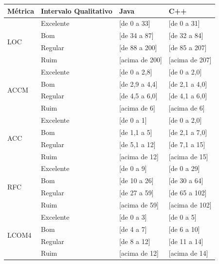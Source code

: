 \begin{table}[!ht]
	\begin{center}
	\begin{tabular}{ |l|l|l|l| }
		\hline
		Métrica & Intervalo Qualitativo & Java & C++ \\ \hline
		\multirow{4}{*}{LOC} 
		 & Excelente & [de 0 a 33] & [de 0 a 31] \\
		 & Bom & [de 34 a 87] & [de 32 a 84] \\
		 & Regular & [de 88 a 200] & [de 85 a 207] \\
		 & Ruim & [acima de 200] & [acima de 207] \\ \hline

		\multirow{4}{*}{ACCM} 
		 & Excelente & [de 0 a 2,8] & [de 0 a 2,0] \\
		 & Bom & [de 2,9 a 4,4] & [de 2,1 a 4,0] \\
		 & Regular & [de 4,5 a 6,0] & [de 4,1 a 6,0] \\
		 & Ruim & [acima de 6] & [acima de 6] \\ \hline


		\multirow{4}{*}{ACC} 
		 & Excelente & [de 0 a 1] & [de 0 a 2,0] \\
		 & Bom & [de 1,1 a 5] & [de 2,1 a 7,0] \\
		 & Regular & [de 5,1 a 12] & [de 7,1 a 15] \\
		 & Ruim & [acima de 12] & [acima de 15] \\ \hline


		\multirow{4}{*}{RFC} 
		 & Excelente & [de 0 a 9] & [de 0 a 29] \\
		 & Bom & [de 10 a 26] & [de 30 a 64] \\
		 & Regular & [de 27 a 59] & [de 65 a 102] \\
		 & Ruim & [acima de 59] & [acima de 102] \\ \hline

		\multirow{4}{*}{LCOM4} 
		 & Excelente & [de 0 a 3] & [de 0 a 5] \\
		 & Bom & [de 4 a 7] & [de 6 a 10] \\
		 & Regular & [de 8 a 12] & [de 11 a 14] \\
		 & Ruim & [acima de 12] & [acima de 14] \\ \hline


\end{tabular}
\end{center}
\end{table}
